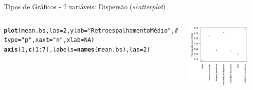 \documentclass{beamer}\usepackage[]{graphicx}\usepackage[]{color}
\makeatletter
\newcommand{\hlnum}[1]{\textcolor[rgb]{0.686,0.059,0.569}{#1}}%
\newcommand{\hlstr}[1]{\textcolor[rgb]{0.192,0.494,0.8}{#1}}%
\newcommand{\hlcom}[1]{\textcolor[rgb]{0.678,0.584,0.686}{\textit{#1}}}%
\newcommand{\hlopt}[1]{\textcolor[rgb]{0,0,0}{#1}}%
\newcommand{\hlstd}[1]{\textcolor[rgb]{0.345,0.345,0.345}{#1}}%
\newcommand{\hlkwc}[1]{\textcolor[rgb]{0.333,0.667,0.333}{#1}}%
\newcommand{\hlkwd}[1]{\textcolor[rgb]{0.737,0.353,0.396}{\textbf{#1}}}%
\newenvironment{kframe}{%
 \def\at@end@of@kframe{}%
 \ifinner\ifhmode%
  \def\at@end@of@kframe{\end{minipage}}%
  \begin{minipage}{\columnwidth}%
 \fi\fi%
 \def\FrameCommand##1{\hskip\@totalleftmargin \hskip-\fboxsep
 \colorbox{shadecolor}{##1}\hskip-\fboxsep
     \hskip-\linewidth \hskip-\@totalleftmargin \hskip\columnwidth}%
 \MakeFramed {\advance\hsize-\width
   \@totalleftmargin\z@ \linewidth\hsize
   \@setminipage}}%
 {\par\unskip\endMakeFramed%
 \at@end@of@kframe}
\newenvironment{knitrout}{}{} %
\renewenvironment{knitrout}{\setlength{\topsep}{0mm}}{}
\makeatother
\begin{document}
\begin{frame}[fragile]{Tipos de Gráficos - 2 variáveis: Dispersão (\emph{scatterplot})}

\begin{columns}[t]


\begin{knitrout}\tiny
{}\color{fgcolor}\begin{kframe}
\begin{alltt}
\hlkwd{plot}\hlstd{(mean.bs,}\hlkwc{las}\hlstd{=}\hlnum{2}\hlstd{,}\hlkwc{ylab}\hlstd{=}\hlstr{"Retroespalhamento Médio"}\hlstd{,}\hlcom{#}
     \hlkwc{type}\hlstd{=}\hlstr{"p"}\hlstd{,}\hlkwc{xaxt}\hlstd{=}\hlstr{"n"}\hlstd{,}\hlkwc{xlab}\hlstd{=}\hlnum{NA}\hlstd{)}
\hlkwd{axis}\hlstd{(}\hlnum{1}\hlstd{,}\hlkwd{c}\hlstd{(}\hlnum{1}\hlopt{:}\hlnum{7}\hlstd{),}\hlkwc{labels}\hlstd{=}\hlkwd{names}\hlstd{(mean.bs),}\hlkwc{las}\hlstd{=}\hlnum{2}\hlstd{)}
\end{alltt}
\end{kframe}
\end{knitrout}


\begin{knitrout}
\color{fgcolor}
\includegraphics[width=1\linewidth]{figure/unnamed-chunk-59-1} 

\end{knitrout}

\end{columns}

\end{frame}
\end{document}
